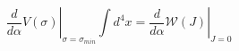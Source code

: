 \begin{equation}  \label{27}
\left.\frac{d}{d\alpha}V(\sigma)\right|_{\sigma=\sigma_{min}}\int d^{4}x=
\left.\frac{d}{d\alpha}\mathcal{W}(J)\right|_{J=0}
\end{equation}

